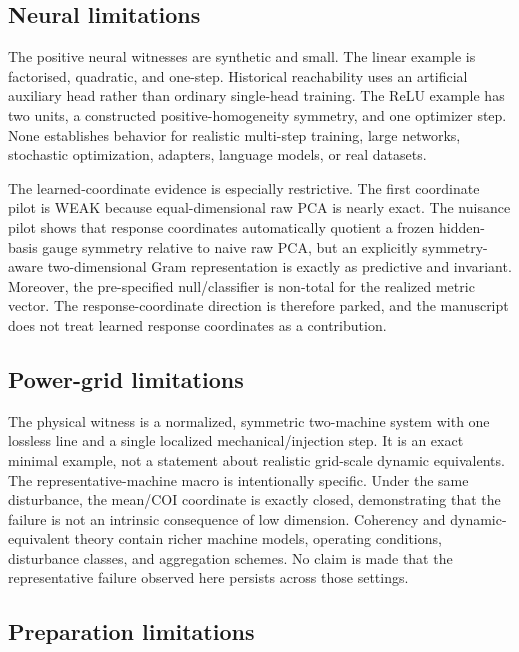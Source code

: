 \subsection{Neural limitations}

The positive neural witnesses are synthetic and small. The linear example is factorised, quadratic, and one-step. Historical reachability uses an artificial auxiliary head rather than ordinary single-head training. The ReLU example has two units, a constructed positive-homogeneity symmetry, and one optimizer step. None establishes behavior for realistic multi-step training, large networks, stochastic optimization, adapters, language models, or real datasets.

The learned-coordinate evidence is especially restrictive. The first coordinate pilot is WEAK because equal-dimensional raw PCA is nearly exact. The nuisance pilot shows that response coordinates automatically quotient a frozen hidden-basis gauge symmetry relative to naive raw PCA, but an explicitly symmetry-aware two-dimensional Gram representation is exactly as predictive and invariant. Moreover, the pre-specified null/classifier is non-total for the realized metric vector. The response-coordinate direction is therefore parked, and the manuscript does not treat learned response coordinates as a contribution.

\subsection{Power-grid limitations}

The physical witness is a normalized, symmetric two-machine system with one lossless line and a single localized mechanical/injection step. It is an exact minimal example, not a statement about realistic grid-scale dynamic equivalents. The representative-machine macro is intentionally specific. Under the same disturbance, the mean/COI coordinate is exactly closed, demonstrating that the failure is not an intrinsic consequence of low dimension. Coherency and dynamic-equivalent theory contain richer machine models, operating conditions, disturbance classes, and aggregation schemes.\cite{BergGhafurian1983,Sankaranarayanan1983,Kai2022} No claim is made that the representative failure observed here persists across those settings.

\subsection{Preparation limitations}

